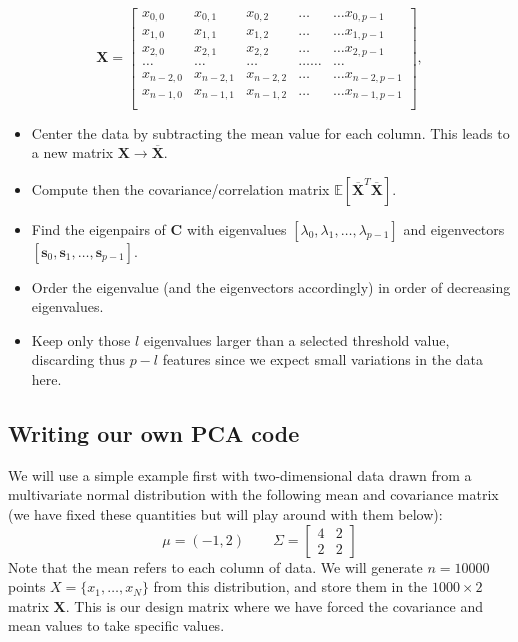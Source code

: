 \documentclass[%
oneside,                 %
final,                   %
10pt]{article}
\begin{document}
\noindent
\[
\bm{X}=\begin{bmatrix}
x_{0,0} & x_{0,1} & x_{0,2}& \dots & \dots x_{0,p-1}\\
x_{1,0} & x_{1,1} & x_{1,2}& \dots & \dots x_{1,p-1}\\
x_{2,0} & x_{2,1} & x_{2,2}& \dots & \dots x_{2,p-1}\\
\dots & \dots & \dots & \dots \dots & \dots \\
x_{n-2,0} & x_{n-2,1} & x_{n-2,2}& \dots & \dots x_{n-2,p-1}\\
x_{n-1,0} & x_{n-1,1} & x_{n-1,2}& \dots & \dots x_{n-1,p-1}\\
\end{bmatrix},
\]
\begin{itemize}
\item Center the data by subtracting the mean value for each column. This leads to a new matrix $\bm{X}\rightarrow \overline{\bm{X}}$.

\item Compute then the covariance/correlation matrix $\mathbb{E}[\overline{\bm{X}}^T\overline{\bm{X}}]$.

\item Find the eigenpairs of $\bm{C}$ with eigenvalues $[\lambda_0,\lambda_1,\dots,\lambda_{p-1}]$ and eigenvectors $[\bm{s}_0,\bm{s}_1,\dots,\bm{s}_{p-1}]$.

\item Order the eigenvalue (and the eigenvectors accordingly) in order of decreasing eigenvalues.

\item Keep only those $l$ eigenvalues larger than a selected threshold value, discarding thus $p-l$ features since we expect small variations in the data here.
\end{itemize}

\noindent
\subsection{Writing our own PCA code}

We will use a simple example first with two-dimensional data
drawn from a multivariate normal distribution with the following mean and covariance matrix (we have fixed these quantities but will play around with them below):
\[
\mu = (-1,2) \qquad \Sigma = \begin{bmatrix} 4 & 2 \\
2 & 2
\end{bmatrix}
\]
Note that the mean refers to each column of data. 
We will generate $n = 10000$ points $X = \{ x_1, \ldots, x_N \}$ from
this distribution, and store them in the $1000 \times 2$ matrix $\bm{X}$. This is our design matrix where we have forced the covariance and mean values to take specific values.
\end{document}
